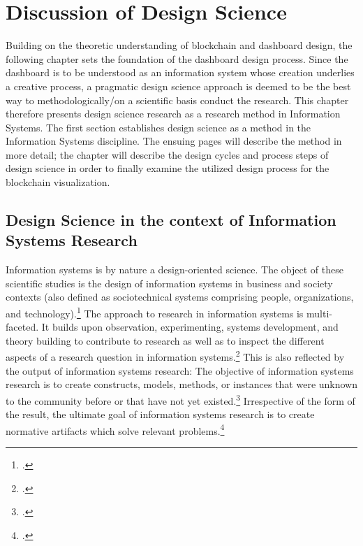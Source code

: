 \chapter{Discussion of Design Science}

Building on the theoretic understanding of blockchain and dashboard design, the following chapter sets the foundation of the dashboard design process. Since the dashboard is to be understood as an information system whose creation underlies a creative process, a pragmatic design science approach is deemed to be the best way to methodologically/on a scientific basis conduct the research. This chapter therefore presents design science research as a research method in Information Systems. The first section establishes design science as a method in the Information Systems discipline. The ensuing pages will describe the method in more detail; the chapter will describe the design cycles and process steps of design science in order to finally examine the utilized design process for the blockchain visualization.

\section{Design Science in the context of Information Systems Research}

Information systems is by nature a design-oriented science. The object of these scientific studies is the design of information systems in business and society contexts (also defined as sociotechnical systems comprising people, organizations, and technology).\footcites[Cf.][p.671]{OsterleMemorandumzurgestaltungsorientierten2010}[cf.][p.98]{HevnerDesignScienceResearch2004}[cf.][p.11]{OsterleGestaltungsorientierteWirtschaftsinformatikPladoyer2010}[cf.][p.252]{MarchDesignnaturalscience1995}
The approach to research in information systems is multi-faceted. It builds upon observation, experimenting, systems development, and theory building to contribute to research as well as to inspect the different aspects of a research question in information systems.\footcite[Cf.][p.86]{NunamakerSystemsdevelopmentInformation1991} This is also reflected by the output of information systems research: The objective of information systems research is to create constructs, models, methods, or instances that were unknown to the community before or that have not yet existed.\footcites[Cf.][p.12]{OsterleGestaltungsorientierteWirtschaftsinformatikPladoyer2010}[cf.][p.130]{ThomasBekannteundweniger2014} 
Irrespective of the form of the result, the ultimate goal of information systems research is to create normative artifacts which solve relevant problems.\footcite[Cf.][p.130]{ThomasBekannteundweniger2014}

